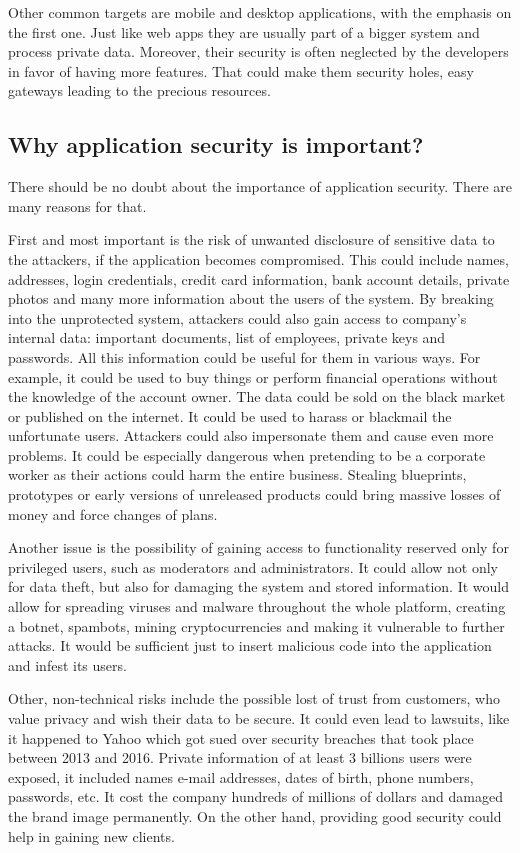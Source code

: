\documentclass[a4paper]{article}
\begin{document}
Other common targets are mobile and desktop applications, with the emphasis on
the first one. Just like web apps they are usually part of a bigger system and
process private data. Moreover, their security is often neglected by the
developers in favor of having more features. That could make them security
holes, easy gateways leading to the precious resources. 

\subsection{Why application security is important?}

There should be no doubt about the importance of application security. There are
many reasons for that.

First and most important is the risk of unwanted disclosure of sensitive data to
the attackers, if the application becomes compromised. This could include names,
addresses, login credentials, credit card information, bank account details,
private photos and many more information about the users of the system. By
breaking into the unprotected system, attackers could also gain access to
company's internal data: important documents, list of employees, private keys
and passwords. All this information could be useful for them in various ways.
For example, it could be used to buy things or perform financial operations
without the knowledge of the account owner. The data could be sold on the black
market or published on the internet. It could be used to harass or blackmail the
unfortunate users. Attackers could also impersonate them and cause even more
problems. It could be especially dangerous when pretending to be a corporate
worker as their actions could harm the entire business. Stealing blueprints,
prototypes or early versions of unreleased products could bring massive
losses of money and force changes of plans.

Another issue is the possibility of gaining access to functionality reserved
only for privileged users, such as moderators and administrators. It could allow
not only for data theft, but also for damaging the system and stored
information. It would allow for spreading viruses and malware throughout the
whole platform, creating a botnet, spambots, mining cryptocurrencies and making
it vulnerable to further attacks. It would be sufficient just to insert
malicious code into the application and infest its users.

Other, non-technical risks include the possible lost of trust from customers,
who value privacy and wish their data to be secure. It could even lead to
lawsuits, like it happened to Yahoo which got sued over security breaches that 
took place between 2013 and 2016. Private information of at least 3 billions 
users were exposed, it included names e-mail addresses, dates of birth,
phone numbers, passwords, etc. It cost the company hundreds of millions of
dollars and damaged the brand image permanently. On the other hand, providing
good security could help in gaining new clients.
\end{document}
